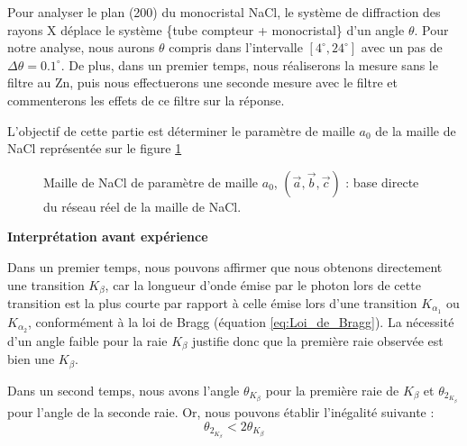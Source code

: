 Pour analyser le plan (200) du monocristal NaCl, le système de diffraction des rayons X déplace le système \{tube compteur + monocristal\} d'un angle $\theta$. Pour notre analyse, nous aurons $\theta$ compris dans l'intervalle $[4^\circ, 24^\circ]$ avec un pas de $\Delta \theta = 0.1^\circ$. De plus, dans un premier temps, nous réaliserons la mesure sans le filtre au Zn, puis nous effectuerons une seconde mesure avec le filtre et commenterons les effets de ce filtre sur la réponse.











\newpage

L'objectif de cette partie est déterminer le paramètre de maille $a_0$ de la maille de NaCl représentée sur le figure \ref{fig:cristalnacl}
\begin{figure}[h!]
	\centering
	
	\caption{\centering Maille de NaCl de paramètre de maille $a_0$, $\left(\vec{a}, \vec{b}, \vec{c}\right)$ : base directe du réseau réel de la maille de NaCl.}
	\label{fig:cristalnacl}
\end{figure}







\begin{flushleft}
	\textbf{Interprétation avant expérience}
\end{flushleft}

\vspace{-0.5cm}

Dans un premier temps, nous pouvons affirmer que nous obtenons directement une transition $K_{\beta}$, car la longueur d'onde émise par le photon lors de cette transition est la plus courte par rapport à celle émise lors d'une transition $K_{\alpha_1}$ ou $K_{\alpha_2}$, conformément à la loi de Bragg (équation \ref{eq:Loi_de_Bragg}). La nécessité d'un angle faible pour la raie $K_{\beta}$ justifie donc que la première raie observée est bien une $K_{\beta}$.

Dans un second temps, nous avons l'angle $\theta_{K_\beta}$ pour la première raie de $K_{\beta}$ et $\theta_{2_{K_{\beta}}} $ pour l'angle de la seconde raie. Or, nous pouvons établir l'inégalité suivante :
\begin{equation} \label{eq:Inegalite_theta}
	\theta_{2_{K_{\beta}}} < 2\theta_{K_\beta}
\end{equation}

